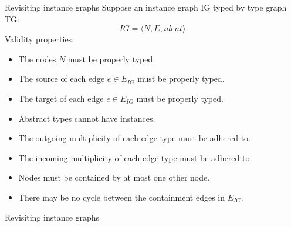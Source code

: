 \begin{frame}{Revisiting instance graphs}
Suppose an instance graph IG typed by type graph TG:
\begin{equation*}
    IG = \langle N, E, ident \rangle
\end{equation*}
\vspace{0.5cm}
Validity properties:
\begin{itemize}
    \item The nodes $N$ must be properly typed.
    \item The source of each edge $e \in E_{IG}$ must be properly typed.
    \item The target of each edge $e \in E_{IG}$ must be properly typed.
    \item Abstract types cannot have instances.
    \item The outgoing multiplicity of each edge type must be adhered to.
    \item The incoming multiplicity of each edge type must be adhered to.
    \item Nodes must be contained by at most one other node.
    \item There may be no cycle between the containment edges in $E_{IG}$.
\end{itemize}
\end{frame}

\begin{frame}{Revisiting instance graphs}
\begin{columns}[c]
    \begin{column}{0.05\textwidth}
    \end{column}\begin{column}{0.3\textwidth}
        \centering
        
    \end{column}\begin{column}{0.3\textwidth}
        \centering
        
    \end{column}\begin{column}{0.3\textwidth}
        \centering
        
    \end{column}
\end{columns}
\end{frame}


